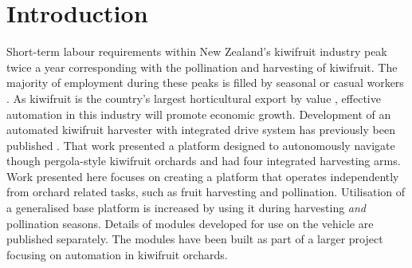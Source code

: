 \documentclass[preprint,authoryear,12pt]{elsarticle}
\begin{document}


\section{Introduction}
\label{sect:intro}
    Short-term labour requirements within New Zealand's kiwifruit industry peak twice a year corresponding with the pollination and harvesting of kiwifruit.
    The majority of employment during these peaks is filled by seasonal or casual workers \citep{Timmins2009}.
    As kiwifruit is the country's largest horticultural export by value \citep{StatisticsNewZealand2015}, effective automation in this industry will promote economic growth.
    Development of an automated kiwifruit harvester with integrated drive system has previously been published \citep{Scarfe2012}.
    That work presented a platform designed to autonomously navigate though pergola-style kiwifruit orchards and had four integrated harvesting arms.
    Work presented here focuses on creating a platform that operates independently from orchard related tasks, such as fruit harvesting and pollination.
    Utilisation of a generalised base platform is increased by using it during harvesting \emph{and} pollination seasons.
    Details of modules developed for use on the vehicle are published separately.
    The modules have been built as part of a larger project focusing on automation in kiwifruit orchards.
\end{document}
